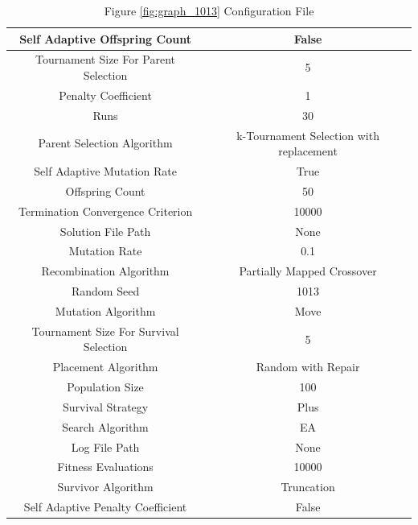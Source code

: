 \documentclass{standalone}
\begin{document}
\begin{table}[!htb]
	\centering
	\caption{Figure \ref{fig:graph_1013} Configuration File}
	\label{tab:graph_1013}
	\begin{tabular}{| c | c |}
		\hline
		Self Adaptive Offspring Count		& False		 \\
		\hline
		Tournament Size For Parent Selection		& 5		 \\
		\hline
		Penalty Coefficient		& 1		 \\
		\hline
		Runs		& 30		 \\
		\hline
		Parent Selection Algorithm		& k-Tournament Selection with replacement		 \\
		\hline
		Self Adaptive Mutation Rate		& True		 \\
		\hline
		Offspring Count		& 50		 \\
		\hline
		Termination Convergence Criterion		& 10000		 \\
		\hline
		Solution File Path		& None		 \\
		\hline
		Mutation Rate		& 0.1		 \\
		\hline
		Recombination Algorithm		& Partially Mapped Crossover		 \\
		\hline
		Random Seed		& 1013		 \\
		\hline
		Mutation Algorithm		& Move		 \\
		\hline
		Tournament Size For Survival Selection		& 5		 \\
		\hline
		Placement Algorithm		& Random with Repair		 \\
		\hline
		Population Size		& 100		 \\
		\hline
		Survival Strategy		& Plus		 \\
		\hline
		Search Algorithm		& EA		 \\
		\hline
		Log File Path		& None		 \\
		\hline
		Fitness Evaluations		& 10000		 \\
		\hline
		Survivor Algorithm		& Truncation		 \\
		\hline
		Self Adaptive Penalty Coefficient		& False		 \\
		\hline
	\end{tabular}
\end{table}
\end{document}
